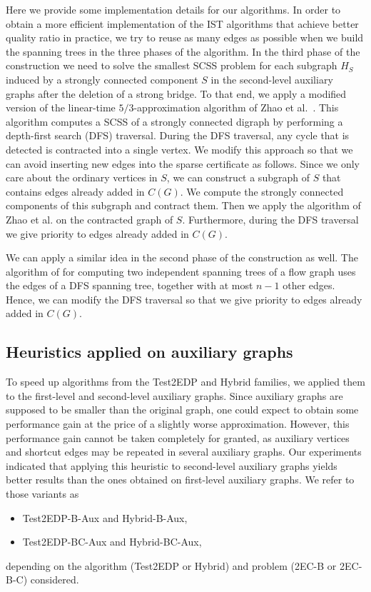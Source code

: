 \documentclass[11pt]{article}
\begin{document}
Here we provide some implementation details for our algorithms.
In order to obtain a more efficient implementation of the \textsf{IST} algorithms that achieve better quality ratio in practice,
we try to reuse as many edges as possible when we build the spanning trees in the three phases of the algorithm.
In the third phase of the construction we need to solve the smallest \textsf{SCSS} problem for each subgraph $H_S$ induced by a strongly connected component $S$ in the second-level auxiliary
graphs after the deletion of a strong bridge.
To that end, we apply a modified version of the linear-time $5/3$-approximation algorithm of Zhao et al.~\cite{ZNI:MSCS:2003}.
This algorithm computes a  \textsf{SCSS} of a strongly connected digraph by performing a depth-first search (DFS) traversal.
During the DFS traversal, any cycle that is detected is contracted into a single vertex.
We modify this approach so that we can avoid inserting new edges into the sparse certificate as follows.
Since we only care about the ordinary vertices in $S$, we can construct a subgraph of $S$ that contains edges already added in $C(G)$.
We compute the strongly connected components of this subgraph and contract them. Then we apply the algorithm of Zhao et al. on the contracted graph of $S$.
Furthermore, during the DFS traversal we give priority to edges already added in $C(G)$.

We can apply a similar idea in the second phase of the construction as well.
The algorithm of \cite{domv:gt05} for computing two independent spanning trees of a flow graph uses the edges of a DFS spanning tree, together with at most $n-1$ other edges.
Hence, we can modify the DFS traversal so that we give priority to edges already added in $C(G)$.


\subsection{Heuristics applied on auxiliary graphs}
\label{section:auxiliary}

To speed up algorithms from the \textsf{Test2EDP} and
\textsf{Hybrid} families, we applied them
 to the first-level and second-level auxiliary graphs. Since auxiliary graphs are supposed to be smaller than the original graph, one could expect to obtain some performance gain at the price of a slightly worse approximation.
However, this performance gain cannot be taken completely for granted, as auxiliary vertices and shortcut edges may be repeated in several auxiliary graphs.
Our experiments indicated that applying this heuristic to second-level auxiliary graphs yields better results than the ones obtained on first-level auxiliary graphs.
We refer to those variants as
\begin{itemize}
\item \textsf{Test2EDP-B-Aux} and \textsf{Hybrid-B-Aux},
\item \textsf{Test2EDP-BC-Aux} and \textsf{Hybrid-BC-Aux},
\end{itemize}
depending on the algorithm (\textsf{Test2EDP} or \textsf{Hybrid}) and problem (\textsf{2EC-B} or \textsf{2EC-B-C}) considered.
\end{document}
